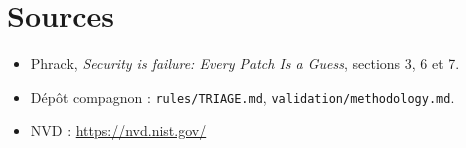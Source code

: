 \documentclass{training}
\begin{document}
\chapter{Sources}
\begin{itemize}
  \item Phrack, \emph{Security is failure: Every Patch Is a Guess},
        sections 3, 6 et 7.
  \item Dépôt compagnon : \texttt{rules/TRIAGE.md},
        \texttt{validation/methodology.md}.
  \item NVD : \url{https://nvd.nist.gov/}
\end{itemize}

\end{document}
